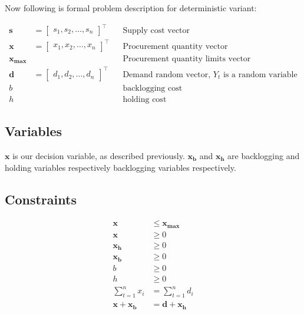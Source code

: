 Now following is formal problem description for deterministic variant:

\begin{align*}
    \mathbf{s} &= \begin{bmatrix}
        s_1, s_2, \dotsc, s_n
    \end{bmatrix}^\intercal && \text{Supply cost vector} \\
    \mathbf{x} &= \begin{bmatrix}
        x_1, x_2, \dotsc, x_n
    \end{bmatrix}^\intercal && \text{Procurement quantity vector} \\
    \mathbf{x_{\max}}  & && \text{Procurement quantity limits vector} \\
    \mathbf{d} &= \begin{bmatrix}
        d_1, d_2, \dotsc, d_n
    \end{bmatrix}^\intercal && \text{Demand random vector, $Y_t$ is a random variable} \\
    b & && \text{backlogging cost} \\
    h & && \text{holding cost}
\end{align*}

\subsection{Variables}
\label{sub:Variables}
$\mathbf{x}$ is our decision variable, as described previously. $\mathbf{x_b}$ and $\mathbf{x_h}$ are backlogging and holding variables respectively backlogging variables respectively.

\subsection{Constraints}
\label{sub:Constraints}
\begin{align*}
    \mathbf{x} &\le \mathbf{x_{\text{max}}}\\
    \mathbf{x} &\ge 0 \\
    \mathbf{x_h} &\ge 0 \\
    \mathbf{x_b} &\ge 0 \\
    b &\ge 0\\
    h &\ge 0\\
    \sum_{t=1}^n{x_i} &= \sum_{t=1}^n{d_i}\\
    \mathbf{x} + \mathbf{x_b} &= \mathbf{d} + \mathbf{x_h} \\
\end{align*}

